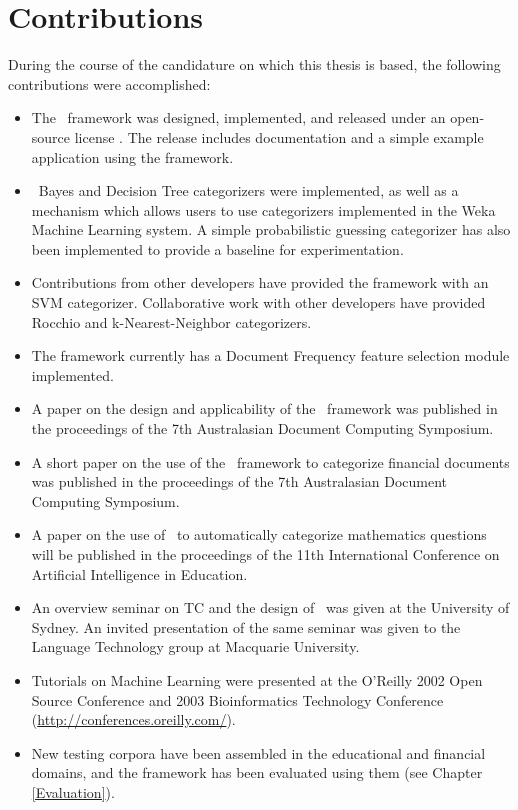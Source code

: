 \section{Contributions}

During the course of the candidature on which this thesis is based,
the following contributions were accomplished:

\begin{itemize}
\item The \aicat\ framework was designed, implemented, and released
  under an open-source license \cite{cpan}.  The release includes
  documentation and a simple example application using the framework.
\item \naive\ Bayes and Decision Tree categorizers were implemented,
  as well as a mechanism which allows users to use categorizers
  implemented in the Weka Machine Learning system\cite{weka:99}.  A
  simple probabilistic guessing categorizer has also been implemented
  to provide a baseline for experimentation.
\item Contributions from other developers have provided the framework
  with an SVM categorizer.  Collaborative work with other developers
  have provided Rocchio and k-Nearest-Neighbor categorizers.
\item The framework currently has a Document Frequency feature
  selection module implemented.
\item A paper on the design and applicability of the \aicat\ framework
  was published in the proceedings of the 7th Australasian Document
  Computing Symposium. \cite{williams:02}
\item A short paper on the use of the \aicat\ framework to categorize
  financial documents was published in the proceedings of the
  7th Australasian Document Computing Symposium. \cite{calvo:02}
\item A paper on the use of \aicat\ to automatically categorize
  mathematics questions will be published in the
  proceedings of the 11th International Conference on Artificial Intelligence in
  Education.  \cite{williams:03}
\item An overview seminar on TC and the design of \aicat\ was given at
  the University of Sydney.  An invited presentation of the same
  seminar was given to the Language Technology group at Macquarie
  University.
\item Tutorials on Machine Learning were presented at the O'Reilly
  2002 Open Source Conference and 2003 Bioinformatics Technology
  Conference (\url{http://conferences.oreilly.com/}).
\item New testing corpora have been assembled in the educational and
  financial domains, and the framework has been evaluated using them
  (see Chapter \ref{Evaluation}).
\end{itemize}


